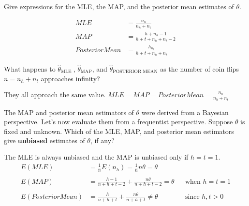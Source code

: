 \documentclass[12pt,letterpaper]{article}
\begin{document}
\begin{problem}{7.2}
    Give expressions for the MLE, the MAP, and the posterior mean estimates of $\theta$.
\end{problem}
\begin{solution}{}
    \begin{align*}
        MLE &= \frac{n_h}{n_h+n_t}\\
        MAP &= \frac{h+n_h-1}{h+t+n_h+n_t-2}\\
        Posterior Mean &= \frac{h_n_h}{h+t+n_h+n_t} 
    \end{align*}
\end{solution}
\newpage

\begin{problem}{7.3}
    What happens to $\hat{\theta}_{\text{MLE }}$, $\hat{\theta}_{\text{MAP}}$,
    and $\hat{\theta}_{\text{POSTERIOR MEAN}}$ as the number of coin
    flips $n=n_{h}+n_{t}$ approaches infinity?
\end{problem}
\begin{solution}{}
    They all approach the same value. $MLE = MAP = Posterior Mean = \frac{n_h}{n_h+n_t}$
\end{solution}
\newpage

\begin{problem}{7.4}
    The MAP and posterior mean estimators of $\theta$
    were derived from a Bayesian perspective. Let's now evaluate them
    from a frequentist perspective. Suppose $\theta$ is fixed and unknown.
    Which of the MLE, MAP, and posterior mean estimators give \textbf{unbiased}
    estimates of $\theta$, if any?
\end{problem}
\begin{solution}{}
    The MLE  is always unbiased and the MAP is unbiased only if $h=t=1$.
    \begin{align*}
        E(MLE) &= \frac{1}{n}E(n_h) = \frac{1}{n}n\theta = \theta\\
        \\
        E(MAP) &= \frac{h-1}{n+h+t-2} + \frac{n\theta}{n+h+t-2} = \theta &&\text{when $h=t=1$}\\
        \\
        E(Posterior Mean) &= \frac{h}{n+h+t} + \frac{n\theta}{n+h+t} \neq \theta &&\text{since $h,t>0$}
    \end{align*}
\end{solution}
\newpage
\end{document}
